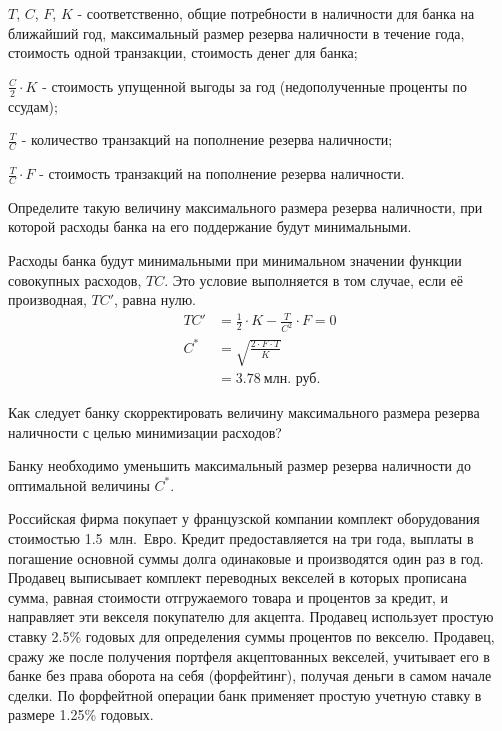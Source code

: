\documentclass[12pt, table]{exam}
\begin{document}
\begin{questions}
\begin{subparts}
\begin{solution}[6em]
		$T$, $C$, $F$, $K$ - соответственно, общие потребности в наличности для банка на ближайший год, максимальный размер резерва наличности в течение года, стоимость одной транзакции, стоимость денег для банка;
		
		$\frac{C}{2}\cdot K$ - стоимость упущенной выгоды за год (недополученные проценты по ссудам);
		
		$\frac{T}{C}$ - количество транзакций на пополнение резерва наличности;
		
		$\frac{T}{C} \cdot F$ - стоимость транзакций на пополнение резерва наличности.
	\end{solution}
	
	\subpart[10] 	Определите такую величину максимального размера резерва наличности, при которой расходы банка на его поддержание будут минимальными. 
	
	\begin{solution}[6em]
		Расходы банка будут минимальными при минимальном значении функции совокупных расходов, $TC$. Это условие выполняется в том случае, если её производная, $TC'$, равна нулю.
		\begin{align}
		TC'&=\frac{1}{2} \cdot K - \frac{T}{C^2} \cdot F = 0\\
		C^*&=\sqrt{\frac{2 \cdot F \cdot T}{K}}\\
		&=3.78~\text{млн. руб.}\nonumber
		\end{align}
		
	\end{solution}
	
	\subpart[2] Как следует банку скорректировать величину максимального размера резерва наличности с целью минимизации расходов?
	
	\begin{solution}[6em]
		Банку необходимо уменьшить максимальный размер резерва наличности до оптимальной величины $C^*$.
	\end{solution}
	
\end{subparts}
\addpoints

\pagebreak
\question[20] Российская фирма покупает у французской компании комплект оборудования стоимостью 1.5~млн.~Евро. Кредит предоставляется на три года, выплаты в погашение основной суммы долга одинаковые и производятся один раз в год.
Продавец выписывает комплект переводных векселей в которых прописана сумма, равная стоимости отгружаемого товара и процентов за кредит, и направляет эти векселя покупателю для акцепта. Продавец использует простую ставку 2.5\% годовых для определения суммы процентов по векселю. 
Продавец, сражу же после получения портфеля акцептованных векселей, учитывает его в банке без права оборота на себя (форфейтинг), получая деньги в самом начале сделки. По форфейтной операции банк применяет простую учетную ставку в размере 1.25\% годовых.


\end{questions}
\end{document}
